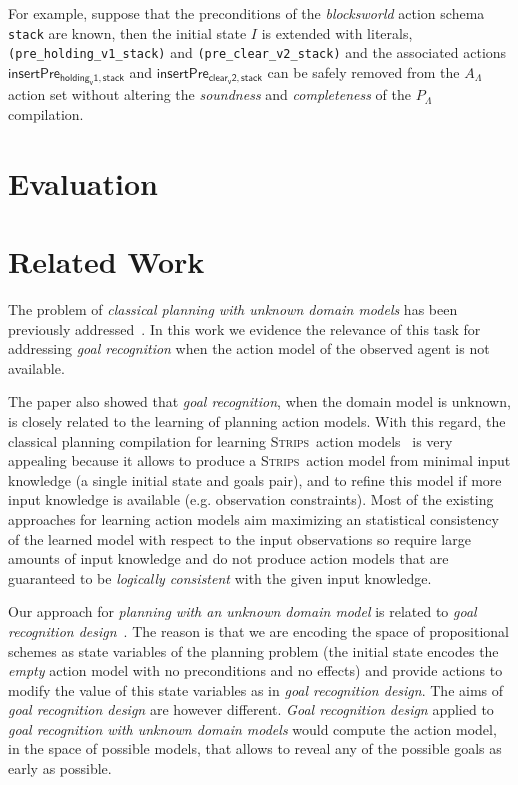 \documentclass[letterpaper]{article} %
\newcommand{\strips}{\textsc{Strips}}     %
\begin{document}
For example, suppose that the preconditions of the {\em blocksworld} action schema {\tt stack} are known, then the initial state $I$ is extended with literals, {\small\tt(pre\_holding\_v1\_stack)} and {\small\tt(pre\_clear\_v2\_stack)} and the associated actions $\mathsf{insertPre_{holding_v1,stack}}$ and $\mathsf{insertPre_{clear_v2,stack}}$ can be safely removed from the $A_{\Lambda}$ action set without altering the {\em soundness} and {\em completeness} of the $P_{\Lambda}$ compilation.
















\section{Evaluation}
\label{sec:evaluation}

\section{Related Work}
\label{sec:evaluation}
The problem of {\em classical planning with unknown domain models} has been previously addressed~\cite{SternJ17}. In this work we evidence the relevance of this task for addressing {\em goal recognition} when the action model of the observed agent is not available.   

The paper also showed that {\em goal recognition}, when the domain model is unknown, is closely related to the learning of planning action models. With this regard, the classical planning compilation for learning \strips\ action models~\cite{aineto2018learning} is very appealing because it allows to produce a \strips\ action model from minimal input knowledge (a single initial state and goals pair), and to refine this model if more input knowledge is available (e.g. observation constraints). Most of the existing approaches for learning action models aim maximizing an statistical consistency of the learned model with respect to the input observations so require large amounts of input knowledge and do not produce action models that are guaranteed to be {\em logically consistent} with the given input knowledge.

Our approach for {\em planning with an unknown domain model} is related to {\em goal recognition design}~\cite{KerenGK14}. The reason is that we are encoding the space of propositional schemes as state variables of the planning problem (the initial state encodes the {\em empty} action model with no preconditions and no effects) and provide actions to modify the value of this state variables as in {\em goal recognition design}. The aims of {\em goal recognition design} are however different. {\em Goal recognition design} applied to {\em goal recognition with unknown domain models} would compute the action model, in the space of possible models, that allows to reveal any of the possible goals as early as possible.
\end{document}
